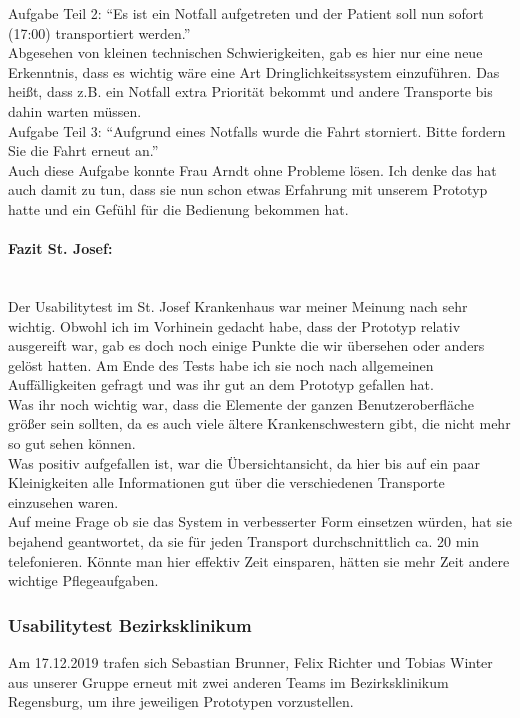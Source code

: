 \documentclass[a4paper, ngerman, 12pt]{scrartcl}
\begin{document}
Aufgabe Teil 2: ``Es ist ein Notfall aufgetreten und der Patient soll nun sofort (17:00) transportiert werden.''\\
Abgesehen von kleinen technischen Schwierigkeiten, gab es hier nur eine neue Erkenntnis, dass es wichtig wäre eine Art Dringlichkeitssystem einzuführen. Das heißt, dass z.B. ein Notfall extra Priorität bekommt und andere Transporte bis dahin warten müssen.\\
Aufgabe Teil 3: ``Aufgrund eines Notfalls wurde die Fahrt storniert. Bitte fordern Sie die Fahrt erneut an.''\\
Auch diese Aufgabe konnte Frau Arndt ohne Probleme lösen. Ich denke das hat auch damit zu tun, dass sie nun schon etwas Erfahrung mit unserem Prototyp hatte und ein Gefühl für die Bedienung bekommen hat.\\
\paragraph{Fazit St. Josef:}\leavevmode\\
Der Usabilitytest im St. Josef Krankenhaus war meiner Meinung nach sehr wichtig. Obwohl ich im Vorhinein gedacht habe, dass der Prototyp relativ ausgereift war, gab es doch noch einige Punkte die wir übersehen oder anders gelöst hatten. Am Ende des Tests habe ich sie noch nach allgemeinen Auffälligkeiten gefragt und was ihr gut an dem Prototyp gefallen hat.\\
Was ihr noch wichtig war, dass die Elemente der ganzen Benutzeroberfläche größer sein sollten, da es auch viele ältere Krankenschwestern gibt, die nicht mehr so gut sehen können.\\
Was positiv aufgefallen ist, war die Übersichtansicht, da hier bis auf ein paar Kleinigkeiten alle Informationen gut über die verschiedenen Transporte einzusehen waren.\\
Auf meine Frage ob sie das System in verbesserter Form einsetzen würden, hat sie bejahend geantwortet, da sie für jeden Transport durchschnittlich ca. 20 min telefonieren. Könnte man hier effektiv Zeit einsparen, hätten sie mehr Zeit andere wichtige Pflegeaufgaben.\\
\subsubsection{Usabilitytest Bezirksklinikum}
Am 17.12.2019 trafen sich Sebastian Brunner, Felix Richter und Tobias Winter aus unserer Gruppe erneut mit zwei anderen Teams im Bezirksklinikum Regensburg, um ihre jeweiligen Prototypen vorzustellen.\\
\end{document}
